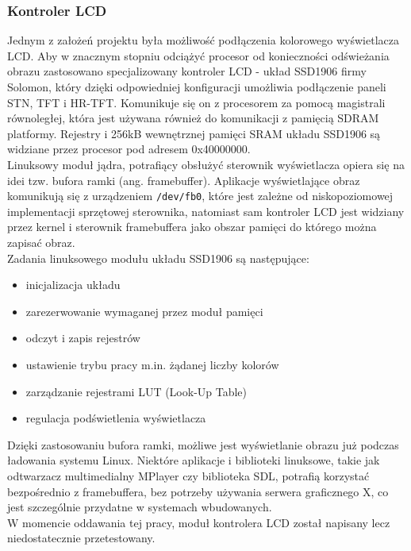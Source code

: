 \documentclass[a4paper,12pt]{book}
\begin{document}
				\subsubsection{Kontroler LCD}
					Jednym z założeń projektu była możliwość podłączenia kolorowego wyświetlacza LCD. Aby w znacznym stopniu odciążyć procesor od konieczności odświeżania obrazu zastosowano specjalizowany kontroler LCD - układ SSD1906 firmy Solomon, który dzięki odpowiedniej konfiguracji umożliwia podłączenie paneli STN, TFT i HR-TFT. Komunikuje się on z procesorem za pomocą magistrali równoległej, która jest używana również do komunikacji z pamięcią SDRAM platformy. Rejestry i 256kB wewnętrznej pamięci SRAM układu SSD1906 są widziane przez procesor pod adresem 0x40000000.\\
					Linuksowy moduł jądra, potrafiący obsłużyć sterownik wyświetlacza opiera się na idei tzw. bufora ramki (ang. framebuffer). Aplikacje wyświetlające obraz komunikują się z urządzeniem \texttt{/dev/fb0}, które jest zależne od niskopoziomowej implementacji sprzętowej sterownika, natomiast sam kontroler LCD jest widziany przez kernel i sterownik framebuffera jako obszar pamięci do którego można zapisać obraz.\\
					Zadania linuksowego modułu układu SSD1906 są następujące:
					\begin{itemize}
						\item inicjalizacja układu
						\item zarezerwowanie wymaganej przez moduł pamięci
						\item odczyt i zapis rejestrów
						\item ustawienie trybu pracy m.in. żądanej liczby kolorów
						\item zarządzanie rejestrami LUT (Look-Up Table)
						\item regulacja podświetlenia wyświetlacza
					\end{itemize}
					Dzięki zastosowaniu bufora ramki, możliwe jest wyświetlanie obrazu już podczas ładowania systemu Linux. Niektóre aplikacje i biblioteki linuksowe, takie jak odtwarzacz multimedialny MPlayer czy biblioteka SDL, potrafią korzystać bezpośrednio z framebuffera, bez potrzeby używania serwera graficznego X, co jest szczególnie przydatne w systemach wbudowanych.\\
					W momencie oddawania tej pracy, moduł kontrolera LCD został napisany lecz niedostatecznie przetestowany.
\end{document}

